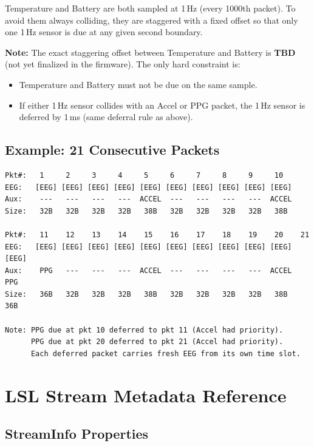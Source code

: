 \documentclass[11pt,a4paper]{article}
\begin{document}
Temperature and Battery are both sampled at 1\,Hz (every 1000th packet).  To avoid them always colliding, they are staggered with a fixed offset so that only one 1\,Hz sensor is due at any given second boundary.

\medskip\noindent
\textbf{Note:} The exact staggering offset between Temperature and Battery is \textbf{TBD} (not yet finalized in the firmware).  The only hard constraint is:

\begin{itemize}
    \item Temperature and Battery must not be due on the same sample.
    \item If either 1\,Hz sensor collides with an Accel or PPG packet, the 1\,Hz sensor is deferred by 1\,ms (same deferral rule as above).
\end{itemize}

\subsection{Example: 21 Consecutive Packets}

\begin{lstlisting}[style=diagram, caption={Scheduling over 21 samples (Accel every 5th, PPG every 10th)}]
Pkt#:   1     2     3     4     5     6     7     8     9     10
EEG:   [EEG] [EEG] [EEG] [EEG] [EEG] [EEG] [EEG] [EEG] [EEG] [EEG]
Aux:    ---   ---   ---   ---  ACCEL  ---   ---   ---   ---  ACCEL
Size:   32B   32B   32B   32B   38B   32B   32B   32B   32B   38B

Pkt#:   11    12    13    14    15    16    17    18    19    20    21
EEG:   [EEG] [EEG] [EEG] [EEG] [EEG] [EEG] [EEG] [EEG] [EEG] [EEG] [EEG]
Aux:    PPG   ---   ---   ---  ACCEL  ---   ---   ---   ---  ACCEL  PPG
Size:   36B   32B   32B   32B   38B   32B   32B   32B   32B   38B   36B

Note: PPG due at pkt 10 deferred to pkt 11 (Accel had priority).
      PPG due at pkt 20 deferred to pkt 21 (Accel had priority).
      Each deferred packet carries fresh EEG from its own time slot.
\end{lstlisting}


\newpage
\section{LSL Stream Metadata Reference}
\label{sec:lsl}

\subsection{StreamInfo Properties}
\end{document}
